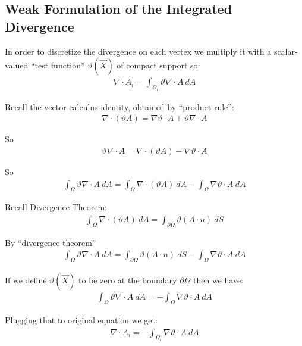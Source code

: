 \documentclass{birkjour}
\numberwithin{equation}{section}
\begin{document}
\subsection{Weak Formulation of the Integrated Divergence}

In order to discretize the divergence on each vertex we multiply it with a scalar-valued “test function” $\vartheta(\vec X)$ of compact support so:
\begin{eqnarray}
	\nabla \cdot A_i = \int_{\Omega_i} {\vartheta \nabla \cdot A \  dA} \nonumber
\end{eqnarray}

Recall the vector calculus identity, obtained by ``product rule'':
\begin{eqnarray}
	\nabla \cdot (\vartheta A) = \nabla \vartheta \cdot A + \vartheta \nabla \cdot A \nonumber
\end{eqnarray}

So
\begin{eqnarray}
	\vartheta \nabla \cdot A  = \nabla \cdot (\vartheta A) - \nabla \vartheta \cdot A \nonumber
\end{eqnarray}

So
\begin{eqnarray}
	\int_{\Omega} {\vartheta \nabla \cdot A \ dA}  = \int_{\Omega} {\nabla \cdot (\vartheta A)  \ dA }- \int_{\Omega} { \nabla \vartheta \cdot A \ dA } \nonumber
\end{eqnarray}

Recall Divergence Theorem:
\begin{eqnarray}
	\int_{\Omega} {\nabla \cdot (\vartheta A)  \ dA }  = \int_{\partial \Omega} { \vartheta (A \cdot n) \ dS } \nonumber
\end{eqnarray}

By “divergence theorem”
\begin{eqnarray}
	\int_{\Omega} {\vartheta \nabla \cdot A \ dA}  = \int_{\partial \Omega} {\vartheta (A \cdot n) \ dS } - \int_{\Omega} { \nabla \vartheta \cdot A \ dA } \nonumber
\end{eqnarray}

If we define $\vartheta(\vec X)$ to be zero at the boundary $\partial \Omega$ then we have:
\begin{eqnarray}
	\int_{\Omega} {\vartheta \nabla \cdot A \ dA}  = - \int_{\Omega} { \nabla \vartheta \cdot A \ dA } \nonumber
\end{eqnarray}

Plugging that to original equation we get:
\begin{eqnarray}
	\nabla \cdot A_i = - \int_{\Omega_i} { \nabla \vartheta \cdot A \ dA } \nonumber
\end{eqnarray}
\end{document}
